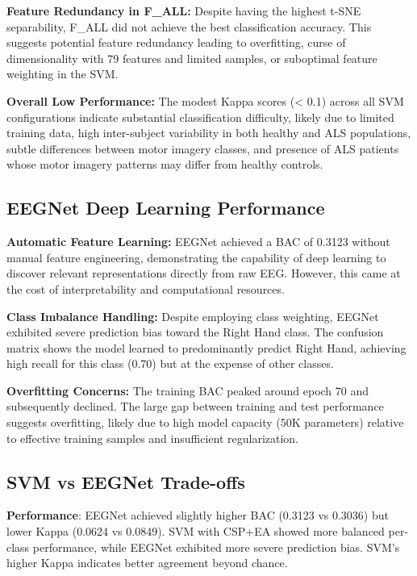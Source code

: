\documentclass[conference]{IEEEtran}
\begin{document}
\textbf{Feature Redundancy in F\_ALL:} Despite having the highest t-SNE separability, F\_ALL did not achieve the best classification accuracy. This suggests potential feature redundancy leading to overfitting, curse of dimensionality with 79 features and limited samples, or suboptimal feature weighting in the SVM.

\textbf{Overall Low Performance:} The modest Kappa scores (< 0.1) across all SVM configurations indicate substantial classification difficulty, likely due to limited training data, high inter-subject variability in both healthy and ALS populations, subtle differences between motor imagery classes, and presence of ALS patients whose motor imagery patterns may differ from healthy controls.

\subsection{EEGNet Deep Learning Performance}

\textbf{Automatic Feature Learning:} EEGNet achieved a BAC of 0.3123 without manual feature engineering, demonstrating the capability of deep learning to discover relevant representations directly from raw EEG. However, this came at the cost of interpretability and computational resources.

\textbf{Class Imbalance Handling:} Despite employing class weighting, EEGNet exhibited severe prediction bias toward the Right Hand class. The confusion matrix shows the model learned to predominantly predict Right Hand, achieving high recall for this class (0.70) but at the expense of other classes.

\textbf{Overfitting Concerns:} The training BAC peaked around epoch 70 and subsequently declined. The large gap between training and test performance suggests overfitting, likely due to high model capacity (50K parameters) relative to effective training samples and insufficient regularization.

\subsection{SVM vs EEGNet Trade-offs}

\textbf{Performance}: EEGNet achieved slightly higher BAC (0.3123 vs 0.3036) but lower Kappa (0.0624 vs 0.0849). SVM with CSP+EA showed more balanced per-class performance, while EEGNet exhibited more severe prediction bias. SVM's higher Kappa indicates better agreement beyond chance.
\end{document}
